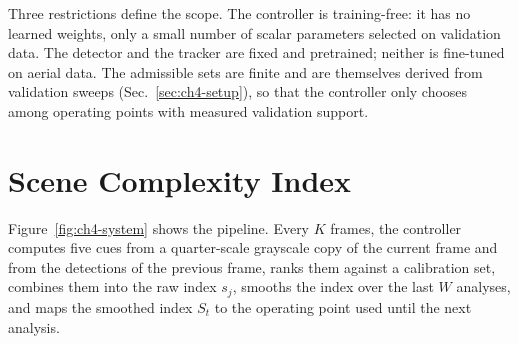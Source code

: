 Three restrictions define the scope. The controller is training-free: it has no learned weights, only a small number of scalar parameters selected on validation data. The detector and the tracker are fixed and pretrained; neither is fine-tuned on aerial data. The admissible sets are finite and are themselves derived from validation sweeps (Sec.~\ref{sec:ch4-setup}), so that the controller only chooses among operating points with measured validation support.

\section{Scene Complexity Index}\label{sec:ch4-method}

Figure~\ref{fig:ch4-system} shows the pipeline. Every $K$ frames, the controller computes five cues from a quarter-scale grayscale copy of the current frame and from the detections of the previous frame, ranks them against a calibration set, combines them into the raw index $s_j$, smooths the index over the last $W$ analyses, and maps the smoothed index $S_t$ to the operating point used until the next analysis.

